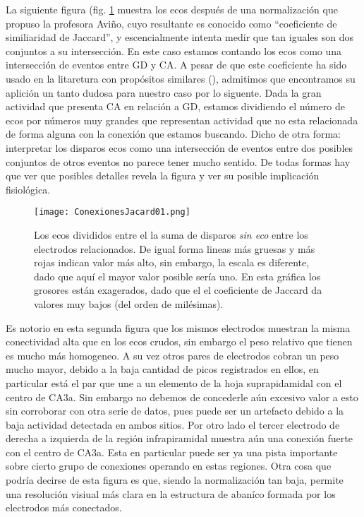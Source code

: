\documentclass{article}
\begin{document}
La siguiente figura (fig. \ref{Jacard} muestra los ecos 
después de  una normalización que propuso
la profesora Aviño, cuyo resultante es conocido como 
``coeficiente de similiaridad de Jaccard'', y escencialmente 
intenta medir que tan iguales son dos conjuntos a su intersección. 
En este caso estamos contando los ecos como una intersección de eventos
entre GD y CA. A pesar de que este coeficiente ha sido usado en la litaretura
con propósitos similares (), admitimos que encontramos su aplición un 
tanto dudosa para nuestro caso por lo siguente. Dada la gran actividad
que presenta CA en relación a GD, estamos dividiendo el número
de ecos por números muy  grandes que representan actividad que no esta
relacionada de forma alguna con la conexión que estamos buscando. Dicho de 
otra forma: interpretar los disparos ecos como una intersección de
eventos entre dos posibles conjuntos de otros eventos no parece
tener mucho sentido. De todas formas  hay que ver que posibles
detalles revela la figura y ver su posible implicación fisiológica.

\begin{figure}[h]
\centering
\texttt{[image: ConexionesJacard01.png]}
\caption{ Los ecos divididos entre el la suma de disparos
\emph{sin eco} entre los electrodos relacionados. De igual forma
lineas más gruesas y más rojas indican valor más alto, sin embargo,
la escala es diferente, dado que aquí el mayor valor posible sería uno.
En esta gráfica los grosores están exagerados, dado que el el 
coeficiente de Jaccard da valores muy bajos (del orden de milésimas).
}\label{Jacard}
\end{figure}

Es notorio en esta segunda figura que los mismos electrodos muestran
la misma conectividad alta que en los ecos crudos, sin embargo el 
peso relativo que tienen es mucho más homogeneo. A su vez otros pares
de electrodos cobran un peso mucho mayor, debido a la baja cantidad
de picos registrados en ellos, en particular está el par que une
a un elemento de la hoja suprapidamidal con el centro de CA3a. 
Sin embargo no debemos de concederle aún excesivo valor a esto
sin corroborar con otra serie de datos, pues puede ser un 
artefacto debido a la baja actividad detectada en ambos sitios. 
Por otro lado el tercer electrodo de derecha a izquierda de la región
infrapiramidal muestra aún una conexión fuerte con el centro de 
CA3a. Esta en particular puede ser ya una pista importante
sobre cierto grupo de conexiones operando en estas regiones. Otra
cosa que podría decirse de esta figura es que, siendo la normalización
tan baja, permite una resolución visiual más clara en la 
estructura de abaníco formada por los electrodos más conectados.
\end{document}
